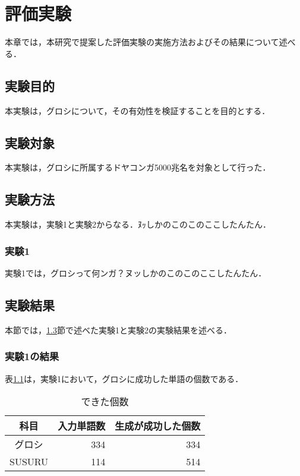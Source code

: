 \documentclass[main]{subfiles}
\begin{document}
\chapter{評価実験}
本章では，本研究で提案した評価実験の実施方法およびその結果について述べる．

\section{実験目的}
本実験は，グロシについて，その有効性を検証することを目的とする．

\section{実験対象}
本実験は，グロシに所属するドヤコンガ5000兆名を対象として行った．

\section{実験方法}\label{how_to_jikken}
本実験は，実験1と実験2からなる．ﾇｯしかのこのこのここしたんたん．

\subsection{実験1}
実験1では，グロシって何ンガ？ヌッしかのこのこのここしたんたん．

\section{実験結果}
本節では，\ref{how_to_jikken}節で述べた実験1と実験2の実験結果を述べる．

\subsection{実験1の結果}
表\ref{table:jikken1_1}は，実験1において，グロシに成功した単語の個数である．

\begin{table}[htb]
    \centering
    \caption{できた個数}
    \label{table:jikken1_1}
    \begin{tabular}{crr} \hline
        科目 & 入力単語数 & 生成が成功した個数 \\ \hline
        グロシ & 334 & 334 \\
        SUSURU & 114 & 514 \\ \hline
    \end{tabular}
\end{table}
\end{document}
